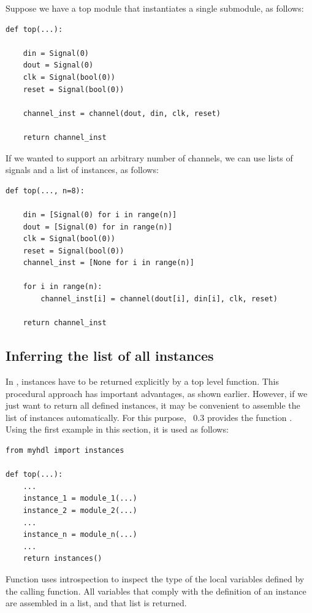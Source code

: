 Suppose we have a top module that instantiates a
single  submodule, as follows:

\begin{verbatim}
def top(...):

    din = Signal(0)
    dout = Signal(0)
    clk = Signal(bool(0))
    reset = Signal(bool(0))

    channel_inst = channel(dout, din, clk, reset)

    return channel_inst 
\end{verbatim}

If we wanted to support an arbitrary number of channels,
we can use lists of signals and a list of instances,
as follows:

\begin{verbatim}
def top(..., n=8):

    din = [Signal(0) for i in range(n)]
    dout = [Signal(0) for in range(n)]
    clk = Signal(bool(0))
    reset = Signal(bool(0))
    channel_inst = [None for i in range(n)]

    for i in range(n):
        channel_inst[i] = channel(dout[i], din[i], clk, reset)

    return channel_inst
\end{verbatim}

\subsection{Inferring the list of all instances \label{model-infer-instlist}}

In \myhdl{}, instances have to be returned explicitly by
a top level function. This procedural approach has important
advantages, as shown earlier. However, if we just want to
return all defined instances, it may be convenient to assemble 
the list of instances automatically. For this purpose,
\myhdl\ 0.3 provides the function .
Using the first example in this section, it is used as follows:

\begin{verbatim}
from myhdl import instances

def top(...):
    ...
    instance_1 = module_1(...)
    instance_2 = module_2(...)
    ...
    instance_n = module_n(...)
    ...
    return instances()
\end{verbatim}

Function  uses introspection to inspect the type
of the local variables defined by the calling function. All variables
that comply with the definition of an instance are assembled in
a list, and that list is returned.


